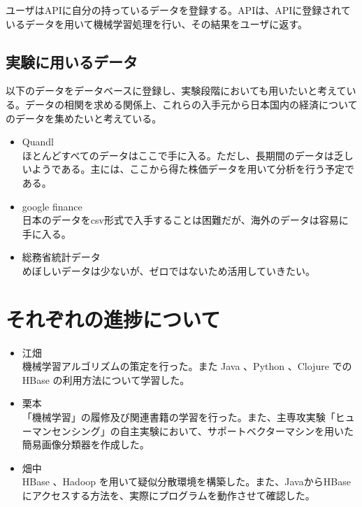 \documentclass{scrartcl}
\begin{document}
ユーザはAPIに自分の持っているデータを登録する。APIは、APIに登録されているデータを用いて機械学習処理を行い、その結果をユーザに返す。\\

\subsection{実験に用いるデータ}
\label{sec:org3a61408}
以下のデータをデータベースに登録し、実験段階においても用いたいと考えている。データの相関を求める関係上、これらの入手元から日本国内の経済についてのデータを集めたいと考えている。\\

\begin{itemize}
\item Quandl\\
ほとんどすべてのデータはここで手に入る。ただし、長期間のデータは乏しいようである。主には、ここから得た株価データを用いて分析を行う予定である。\\
\item google finance\\
日本のデータをcsv形式で入手することは困難だが、海外のデータは容易に手に入る。\\
\item 総務省統計データ\\
めぼしいデータは少ないが、ゼロではないため活用していきたい。\\
\end{itemize}

\section{それぞれの進捗について}
\label{sec:org4e0996c}
\begin{itemize}
\item 江畑\\
機械学習アルゴリズムの策定を行った。また Java 、Python 、Clojure での HBase の利用方法について学習した。\\
\item 栗本\\
「機械学習」の履修及び関連書籍の学習を行った。また、主専攻実験「ヒューマンセンシング」の自主実験において、サポートベクターマシンを用いた簡易画像分類器を作成した。\\
\item 畑中\\
HBase 、Hadoop を用いて疑似分散環境を構築した。また、JavaからHBaseにアクセスする方法を、実際にプログラムを動作させて確認した。\\
\end{itemize}
\end{document}
